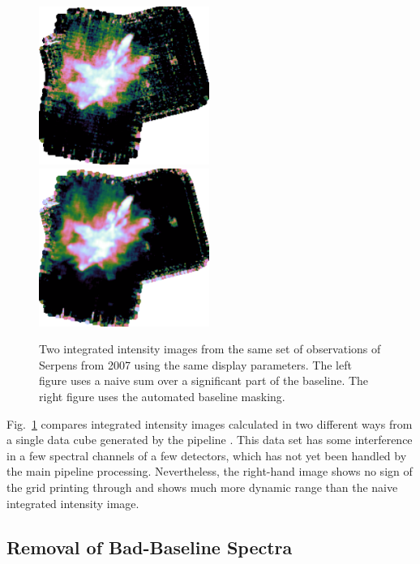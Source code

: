 \documentclass[final,authoryear,5p,times,twocolumn]{elsarticle}
\begin{document}
\begin{figure}[t]
\begin{minipage}{\textwidth}
\centering
\includegraphics[width=0.495\textwidth]{integ_manual.png}
\includegraphics[width=0.495\textwidth]{integ_auto.png}
\caption{Two integrated intensity images from the same set of
  observations of Serpens from 2007 using the same display
  parameters. The left figure uses a naive sum over a significant part
  of the baseline. The right figure uses the automated baseline
  masking.}
\label{fig:integ}
\end{minipage}
\end{figure}

Fig.\ \ref{fig:integ} compares integrated intensity images calculated
in two different ways from a single data cube generated by the
pipeline \citep[see][for details of earlier
reductions of these data]{2010MNRAS.409.1412G,2010A&A...523A..29D}. This data set
has some interference in a few spectral channels of a few detectors,
which has not yet been handled by the main pipeline
processing. Nevertheless, the right-hand image shows no sign of the grid
printing through and shows much more dynamic range than the naive
integrated intensity image.

\subsection{Removal of Bad-Baseline Spectra}
\end{document}
